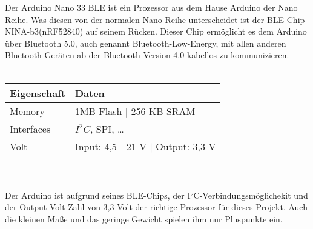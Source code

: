 Der Arduino Nano 33 BLE ist ein Prozessor aus dem Hause Arduino
der Nano Reihe. Was diesen von der normalen Nano-Reihe unterscheidet ist der BLE-Chip
NINA-b3(nRF52840) auf seinem Rücken. Dieser Chip ermöglicht es dem Arduino über 
Bluetooth 5.0, auch genannt Bluetooth-Low-Energy, mit allen anderen Bluetooth-Geräten ab 
der Bluetooth Version 4.0 kabellos zu kommunizieren.\\
\\
\begin{tabularx}{0.8\textwidth}{l|X}
Eigenschaft & Daten \\
\hline
Memory & 1MB Flash | 256 KB SRAM \\ 

Interfaces & $I^2C$, SPI, \dots \\

Volt & Input: 4,5 - 21 V | Output: 3,3 V\\
\end{tabularx}
\\
\\
Der Arduino ist aufgrund seines BLE-Chips, der I²C-Verbindungsmöglichekit und der 
Output-Volt Zahl von 3,3 Volt der richtige Prozessor für dieses Projekt. Auch die 
kleinen Maße und das geringe Gewicht spielen ihm nur Pluspunkte ein.